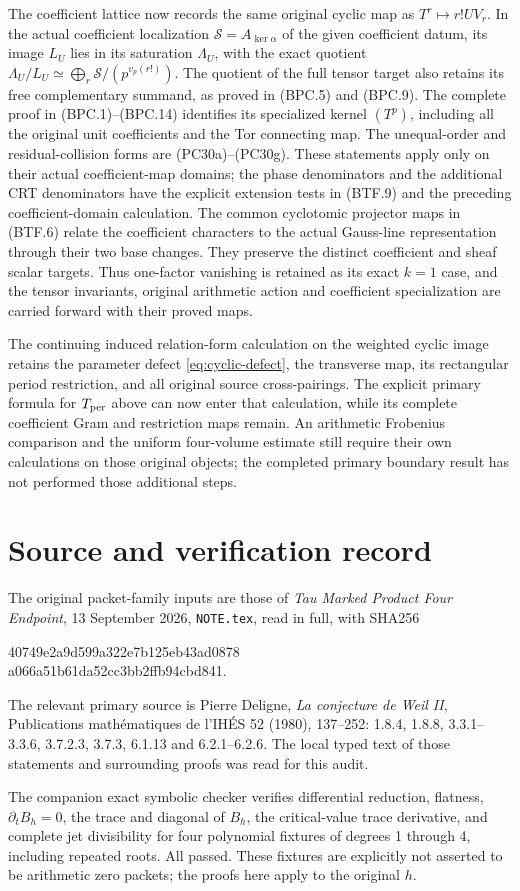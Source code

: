 \documentclass[11pt]{article}
\begin{document}
The coefficient lattice now records the same original cyclic
map as \(T^r\mapsto r!UV_r\).  In the actual coefficient
localization \(\mathscr S=A_{\ker\alpha}\) of the given
coefficient datum, its image \(L_U\) lies in its saturation
\(\Lambda_U\), with the exact quotient
\(\Lambda_U/L_U\simeq
       \bigoplus_r\mathscr S/(p^{v_p(r!)})\).
The quotient of the full tensor target also retains its
free complementary summand, as proved in (BPC.5) and (BPC.9).
The complete proof in (BPC.1)--(BPC.14) identifies its
specialized kernel \((T^p)\), including all the original
unit coefficients and the Tor connecting map.  The
unequal-order and residual-collision forms are
(PC30a)--(PC30g).  These statements apply only on their
actual coefficient-map domains; the phase denominators and
the additional CRT denominators have the explicit extension
tests in (BTF.9) and the preceding coefficient-domain
calculation.  The common cyclotomic projector maps in
(BTF.6) relate the coefficient characters to the actual
Gauss-line representation through their two base changes.
They preserve the distinct coefficient and sheaf scalar
targets.  Thus one-factor vanishing is retained as its exact
\(k=1\) case, and the tensor invariants, original arithmetic
action and coefficient specialization are carried forward
with their proved maps.


The continuing induced relation-form calculation on the weighted
cyclic image retains the parameter defect
\eqref{eq:cyclic-defect}, the transverse map, its rectangular period
restriction, and all original source cross-pairings.  The explicit
primary formula for \(T_{\rm per}\) above can now enter that
calculation, while its complete coefficient Gram and restriction
maps remain.  An arithmetic Frobenius comparison and the uniform
four-volume estimate still require their own calculations on those
original objects; the completed primary boundary result has not
performed those additional steps.


\section*{Source and verification record}
The original packet-family inputs are those of
\emph{Tau Marked Product Four Endpoint}, 13 September 2026,
\texttt{NOTE.tex}, read in full, with SHA256
\begin{center}\ttfamily\small
40749e2a9d599a322e7b125eb43ad0878\\
a066a51b61da52cc3bb2ffb94cbd841.
\end{center}
The relevant primary source is Pierre Deligne,
\emph{La conjecture de Weil II}, Publications math\'ematiques de
l'IH\'ES 52 (1980), 137--252: 1.8.4, 1.8.8, 3.3.1--3.3.6,
3.7.2.3, 3.7.3, 6.1.13 and 6.2.1--6.2.6.  The local typed text of
those statements and surrounding proofs was read for this audit.

The companion exact symbolic checker verifies differential reduction,
flatness, $\partial_tB_h=0$, the trace and diagonal of $B_h$, the
critical-value trace derivative, and complete jet divisibility for four
polynomial fixtures of degrees 1 through 4, including repeated roots.
All passed.  These fixtures are explicitly not asserted to be
arithmetic zero packets; the proofs here apply to the original $h$.
\end{document}
